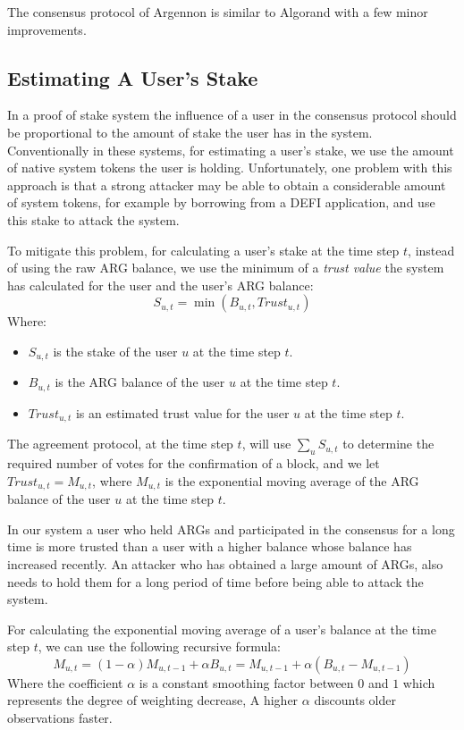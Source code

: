 \documentclass[11pt, A4]{report}
\begin{document}
    The consensus protocol of Argennon is similar to Algorand with a few minor improvements.

    \subsection{Estimating A User's Stake}\label{subsec:estimating-a-user's-stake}

    In a proof of stake system the influence of a user in the consensus protocol should be proportional to the amount
    of stake the user has in the system. Conventionally in these systems, for estimating a user's stake, we use the
    amount of native system tokens the user is holding. Unfortunately, one problem with this approach is that a
    strong attacker may be able to obtain a considerable amount of system tokens, for example by borrowing from a
    DEFI application, and use this stake to attack the system.

    To mitigate this problem, for calculating a user's stake at the time step \(t\), instead of using the raw ARG
    balance, we use the minimum of a \emph{trust value} the system has calculated for the user and the user's
    ARG balance:
    \[
        S_{u,t} = \min (B_{u,t}, Trust_{u,t})
    \]
    Where:
    \begin{itemize}
        \item \(S_{u,t}\) is the stake of the user \(u\) at the time step \(t\).
        \item \(B_{u,t}\) is the ARG balance of the user \(u\) at the time step \(t\).
        \item \(Trust_{u,t}\) is an estimated trust value for the user \(u\) at the time step \(t\).
    \end{itemize}

    The agreement protocol, at the time step \(t\), will use \(\sum_{u}S_{u,t}\) to determine the required
    number of votes for the confirmation of a block, and we let \(Trust_{u,t} = M_{u,t}\), where \(M_{u,t}\) is the
    exponential moving average of the ARG balance of the user \(u\) at the time step \(t\).

    In our system a user who held ARGs and participated in the consensus for a long time is more trusted
    than a user with a higher balance whose balance has increased recently. An attacker who has obtained a large
    amount of ARGs, also needs to hold them for a long period of time before being able to attack the system.

    For calculating the exponential moving average of a user's balance at the time step \(t\), we can use the following
    recursive formula:
    \[
        M_{u,t} = (1 - \alpha) M_{u,t-1} + \alpha B_{u,t} = M_{u,t-1} + \alpha (B_{u,t} - M_{u,t-1})
    \]
    Where the coefficient \(\alpha\) is a constant smoothing factor between \(0\) and \(1\) which represents the
    degree of weighting decrease, A higher \(\alpha\) discounts older observations faster.
\end{document}
